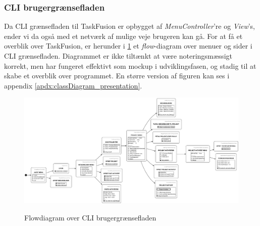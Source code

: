 \subsubsection{CLI brugergrænsefladen}
Da CLI grænsefladen til TaskFusion er opbygget af \textit{MenuController}'re og \textit{View}'s, ender vi da også med et netværk af mulige veje brugeren kan gå. For at få et overblik over TaskFusion, er herunder i \cref{fig:flow_cli} et \textit{flow}-diagram over menuer og sider i CLI grænsefladen. Diagrammet er ikke tiltænkt at være noteringsmæssigt korrekt, men har fungeret effektivt som mockup i udviklingsfasen, og stadig til at skabe et overblik over programmet. En større version af figuren kan ses i appendix \cref{apdx:classDiagram_presentation}.
\begin{figure}[H]
    \centering
    \caption{Flowdiagram over CLI brugergrænsefladen}
    \includegraphics[width = \textwidth]{ImplementationAndTest/Diagrams/FlowCharts/flow_cli.eps}
    \label{fig:flow_cli}
\end{figure}